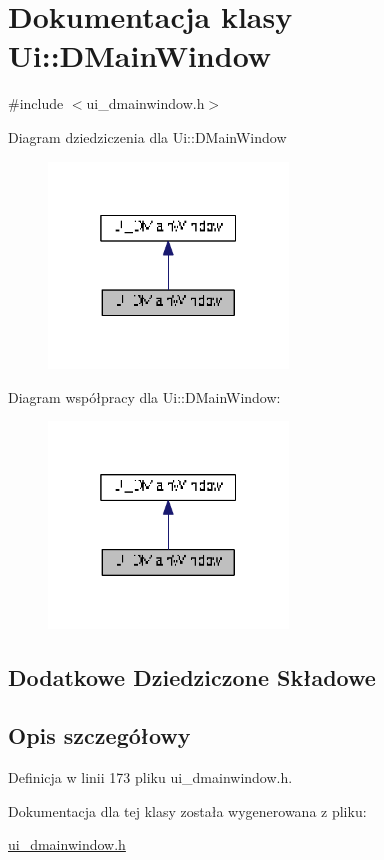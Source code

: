 \hypertarget{class_ui_1_1_d_main_window}{}\section{Dokumentacja klasy Ui\+:\+:D\+Main\+Window}
\label{class_ui_1_1_d_main_window}


{\ttfamily \#include $<$ui\+\_\+dmainwindow.\+h$>$}



Diagram dziedziczenia dla Ui\+:\+:D\+Main\+Window
\nopagebreak
\begin{figure}[H]
\begin{center}
\leavevmode
\includegraphics[width=181pt]{class_ui_1_1_d_main_window__inherit__graph}
\end{center}
\end{figure}


Diagram współpracy dla Ui\+:\+:D\+Main\+Window\+:
\nopagebreak
\begin{figure}[H]
\begin{center}
\leavevmode
\includegraphics[width=181pt]{class_ui_1_1_d_main_window__coll__graph}
\end{center}
\end{figure}
\subsection*{Dodatkowe Dziedziczone Składowe}


\subsection{Opis szczegółowy}


Definicja w linii 173 pliku ui\+\_\+dmainwindow.\+h.



Dokumentacja dla tej klasy została wygenerowana z pliku\+:\begin{DoxyCompactItemize}
\item 
\hyperlink{ui__dmainwindow_8h}{ui\+\_\+dmainwindow.\+h}\end{DoxyCompactItemize}
